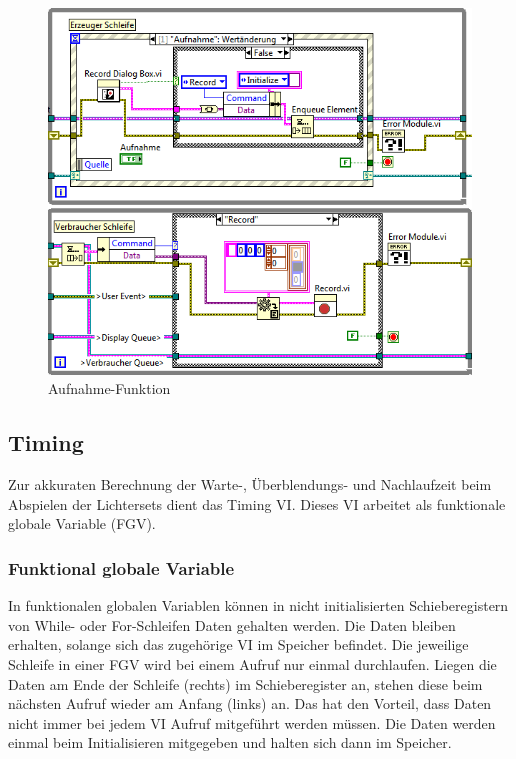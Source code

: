 	\begin{figure}[!ht]
	\centering
		\includegraphics[width=\textwidth]{Pics/record.png}
	\caption{Aufnahme-Funktion}
	\label{fig:rec}
	\end{figure}
	
	
\subsection{Timing}
\label{chap:timing}
Zur akkuraten Berechnung der Warte-, Überblendungs- und Nachlaufzeit beim Abspielen der Lichtersets dient das Timing VI. 
Dieses VI arbeitet als funktionale globale Variable (FGV).

\subsubsection{Funktional globale Variable}
In funktionalen globalen Variablen  können in nicht initialisierten Schieberegistern von While- oder For-Schleifen Daten gehalten werden. 
Die Daten bleiben erhalten, solange sich das zugehörige VI im Speicher befindet. Die jeweilige Schleife in einer FGV wird bei einem Aufruf nur einmal durchlaufen. 
Liegen die Daten am Ende der Schleife (rechts) im Schieberegister an, stehen diese beim nächsten Aufruf wieder am Anfang (links) an. 
Das hat den Vorteil, dass Daten nicht immer bei jedem VI Aufruf mitgeführt werden müssen. 
Die Daten werden einmal beim Initialisieren mitgegeben und halten sich dann im Speicher. \cite{LabViewHilfe}


